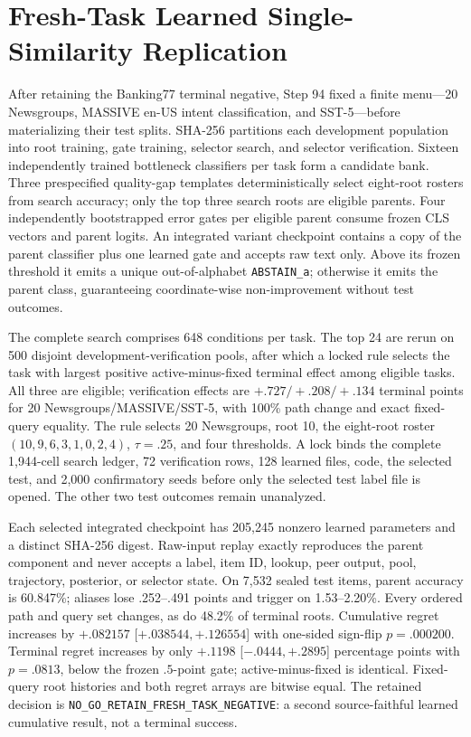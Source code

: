 \section{Fresh-Task Learned Single-Similarity Replication}
\label{app:step94}

After retaining the Banking77 terminal negative, Step 94 fixed a finite menu---20 Newsgroups, MASSIVE en-US intent classification, and SST-5---before materializing their test splits. SHA-256 partitions each development population into root training, gate training, selector search, and selector verification. Sixteen independently trained bottleneck classifiers per task form a candidate bank. Three prespecified quality-gap templates deterministically select eight-root rosters from search accuracy; only the top three search roots are eligible parents. Four independently bootstrapped error gates per eligible parent consume frozen CLS vectors and parent logits. An integrated variant checkpoint contains a copy of the parent classifier plus one learned gate and accepts raw text only. Above its frozen threshold it emits a unique out-of-alphabet \texttt{ABSTAIN\_a}; otherwise it emits the parent class, guaranteeing coordinate-wise non-improvement without test outcomes.

The complete search comprises 648 conditions per task. The top 24 are rerun on 500 disjoint development-verification pools, after which a locked rule selects the task with largest positive active-minus-fixed terminal effect among eligible tasks. All three are eligible; verification effects are $+.727/+.208/+.134$ terminal points for 20 Newsgroups/MASSIVE/SST-5, with 100\% path change and exact fixed-query equality. The rule selects 20 Newsgroups, root 10, the eight-root roster $(10,9,6,3,1,0,2,4)$, $\tau=.25$, and four thresholds. A lock binds the complete 1,944-cell search ledger, 72 verification rows, 128 learned files, code, the selected test, and 2,000 confirmatory seeds before only the selected test label file is opened. The other two test outcomes remain unanalyzed.

Each selected integrated checkpoint has 205,245 nonzero learned parameters and a distinct SHA-256 digest. Raw-input replay exactly reproduces the parent component and never accepts a label, item ID, lookup, peer output, pool, trajectory, posterior, or selector state. On 7,532 sealed test items, parent accuracy is 60.847\%; aliases lose .252--.491 points and trigger on 1.53--2.20\%. Every ordered path and query set changes, as do 48.2\% of terminal roots. Cumulative regret increases by $+.082157$ [$+.038544,+.126554$] with one-sided sign-flip $p=.000200$. Terminal regret increases by only $+.1198$ [$-.0444,+.2895$] percentage points with $p=.0813$, below the frozen $.5$-point gate; active-minus-fixed is identical. Fixed-query root histories and both regret arrays are bitwise equal. The retained decision is \texttt{NO\_GO\_RETAIN\_FRESH\_TASK\_NEGATIVE}: a second source-faithful learned cumulative result, not a terminal success.

